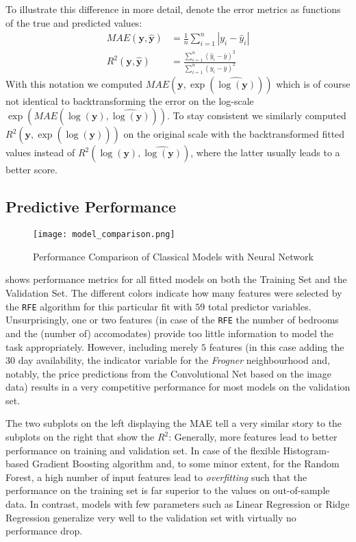To illustrate this difference in more detail, denote the error metrics as functions of the true and predicted values:
\begin{align*}
  MAE(\mathbf{y}, \hat{\mathbf{y}})
   & = \frac{1}{n}\sum_{i = 1}^{n} \left| y_i - \hat{y}_i \right|                                               \\
  R^2(\mathbf{y}, \hat{\mathbf{y}})
   & = \frac{\sum_{i=1}^{n} \left( \hat{y}_i - \bar{y}\right)^2}{\sum_{i=1}^{n} \left( y_i - \bar{y} \right)^2}
\end{align*}
With this notation we computed $MAE(\mathbf{y}, \exp \left(\widehat{\log(\mathbf{y})}\right))$ which is of course not identical to backtransforming the error on the log-scale $\exp \left(MAE(\log(\mathbf{y}), \widehat{\log(\mathbf{y})}) \right)$.
To stay consistent we similarly computed $R^2(\mathbf{y}, \exp \left(\widehat{\log(\mathbf{y})}\right))$ on the original scale with the backtransformed fitted values instead of  $R^2(\log(\mathbf{y}), \widehat{\log(\mathbf{y})})$, where the latter usually leads to a better score.



\subsection{Predictive Performance}

\begin{figure}[t]
  \centering
  \texttt{[image: model\_comparison.png]}
  \caption{Performance Comparison of Classical Models with Neural Network}
  \label{fig:model-comparison}
\end{figure}

 shows performance metrics for all fitted models on both the Training Set and the Validation Set.
The different colors indicate how many features were selected by the \texttt{RFE} algorithm for this particular fit with $59$ total predictor variables.
Unsurprisingly, one or two features (in case of the \texttt{RFE} the number of bedrooms and the (number of) accomodates) provide too little information to model the task appropriately.
However, including merely $5$ features (in this case adding the $30$ day availability, the indicator variable for the \emph{Frogner} neighbourhood and, notably, the price predictions from the Convolutional Net based on the image data) results in a very competitive performance for most models on the validation set.

The two subplots on the left displaying the MAE tell a very similar story to the subplots on the right that show the $R^2$:
Generally, more features lead to better performance on training and validation set.
In case of the flexible Histogram-based Gradient Boosting algorithm and, to some minor extent, for the Random Forest, a high number of input features lead to \emph{overfitting} such that the performance on the training set is far superior to the values on out-of-sample data.
In contrast, models with few parameters such as Linear Regression or Ridge Regression generalize very well to the validation set with virtually no performance drop.

